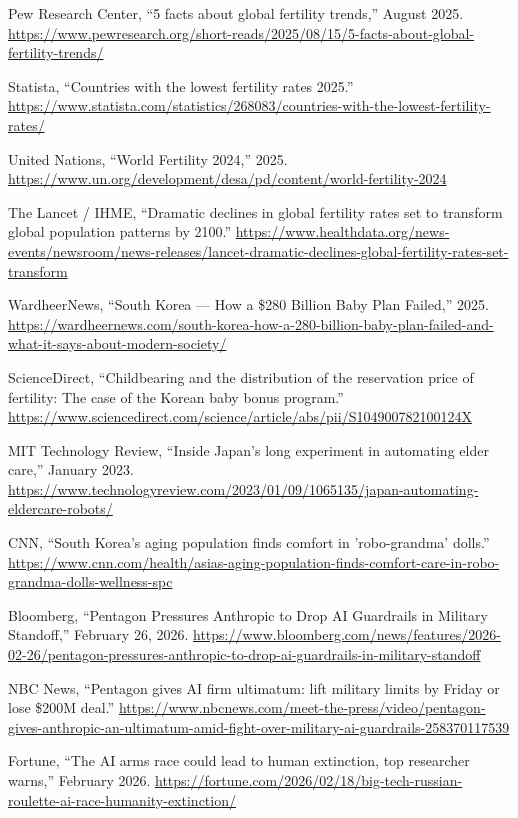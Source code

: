 \documentclass[11pt,a4paper]{article}
\begin{document}
\noindent [4] Pew Research Center, ``5 facts about global fertility trends,'' August 2025. \url{https://www.pewresearch.org/short-reads/2025/08/15/5-facts-about-global-fertility-trends/}

\noindent [5] Statista, ``Countries with the lowest fertility rates 2025.'' \url{https://www.statista.com/statistics/268083/countries-with-the-lowest-fertility-rates/}

\noindent [6] United Nations, ``World Fertility 2024,'' 2025. \url{https://www.un.org/development/desa/pd/content/world-fertility-2024}

\noindent [7] The Lancet / IHME, ``Dramatic declines in global fertility rates set to transform global population patterns by 2100.'' \url{https://www.healthdata.org/news-events/newsroom/news-releases/lancet-dramatic-declines-global-fertility-rates-set-transform}

\noindent [8] WardheerNews, ``South Korea --- How a \$280 Billion Baby Plan Failed,'' 2025. \url{https://wardheernews.com/south-korea-how-a-280-billion-baby-plan-failed-and-what-it-says-about-modern-society/}

\noindent [9] ScienceDirect, ``Childbearing and the distribution of the reservation price of fertility: The case of the Korean baby bonus program.'' \url{https://www.sciencedirect.com/science/article/abs/pii/S104900782100124X}

\noindent [10] MIT Technology Review, ``Inside Japan's long experiment in automating elder care,'' January 2023. \url{https://www.technologyreview.com/2023/01/09/1065135/japan-automating-eldercare-robots/}

\noindent [11] CNN, ``South Korea's aging population finds comfort in 'robo-grandma' dolls.'' \url{https://www.cnn.com/health/asias-aging-population-finds-comfort-care-in-robo-grandma-dolls-wellness-spc}

\noindent [12] Bloomberg, ``Pentagon Pressures Anthropic to Drop AI Guardrails in Military Standoff,'' February 26, 2026. \url{https://www.bloomberg.com/news/features/2026-02-26/pentagon-pressures-anthropic-to-drop-ai-guardrails-in-military-standoff}

\noindent [13] NBC News, ``Pentagon gives AI firm ultimatum: lift military limits by Friday or lose \$200M deal.'' \url{https://www.nbcnews.com/meet-the-press/video/pentagon-gives-anthropic-an-ultimatum-amid-fight-over-military-ai-guardrails-258370117539}

\noindent [14] Fortune, ``The AI arms race could lead to human extinction, top researcher warns,'' February 2026. \url{https://fortune.com/2026/02/18/big-tech-russian-roulette-ai-race-humanity-extinction/}
\end{document}
